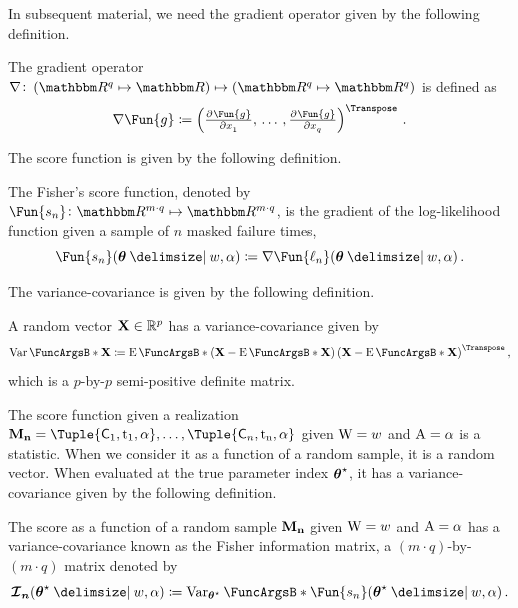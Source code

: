 \documentclass[
    11pt,
    extrafontsizes,
    article,
    oldfontcommands,
    final,
    oneside,
    openany,
    hidelinks]{memoir}
\begin{document}
In subsequent material, we need the gradient operator given by the following definition.
\begin{definition}
The gradient operator $\nabla \colon \left(\RealSet^q \mapsto \RealSet\right) \mapsto \left(\RealSet^q \mapsto \RealSet^q\right)$ is defined as
\begin{equation}
    \nabla \Fun{g} \coloneqq \left (
        \pd{\Fun{g}}{x_1},\,
        \ldots\,,
        \pd{\Fun{g}}{x_q}
    \right )^{\Transpose}\,.
\end{equation}
\end{definition}

The score function is given by the following definition.
\begin{definition}
The Fisher's score function, denoted by $\Fun{s_n} \colon \RealSet^{m \cdot q} \mapsto \RealSet^{m \cdot q}$, is the gradient of the log-likelihood function given a sample of $n$ masked failure times,
\begin{equation}
\label{eq:score}
    \Fun{s_n}(\sysparamvec \Given w, \alpha) \coloneqq \nabla \Fun{\ell_n}(\sysparamvec \Given w, \alpha)\,.
\end{equation}
\end{definition}

The variance-covariance is given by the following definition.
\begin{definition}
A random vector $\mathrm{\boldsymbol{\mathbf{X}}} \in \mathbb{R}^{p}$ has a variance-covariance given by
\begin{equation}
\label{eq:covariance_matrix_op}
    \Var{\RV{\vec{X}}} \coloneqq \Expect{
        \left(\RV{\vec{X}} - \Expect{\RV{\vec{X}}} \right)
        \left(\RV{\vec{X}} - \Expect{\RV{\vec{X}}} \right)^\Transpose
    }\,,
\end{equation}
which is a $p$-by-$p$ semi-positive definite matrix.
\end{definition}

The score function given a realization $\mfs = \Tuple{\cand_1,\ti_1,\alpha},\ldots,\Tuple{\cand_n,\ti_n,\alpha}$ given $\mathrm{W} = w$ and $\mathrm{A} = \alpha$ is a statistic.
When we consider it as a function of a random sample, it is a random vector.
When evaluated at the true parameter index ${\boldsymbol{\mathbf{\theta}}}^{\star}$, it has a variance-covariance given by the following definition.
\begin{definition}
\label{def:info_matrix_var}
The score as a function of a random sample $\boldsymbol{\mathbf{M_n}}$ given $\mathrm{W} = w$ and $\mathrm{A} = \alpha$ has a variance-covariance known as the Fisher information matrix, a $(m \cdot q)$-by-$(m \cdot q)$ matrix denoted by
\begin{equation}
\label{eq:info_matrix_var}
    \infomatrx_{\matrx{n}}(\tparam\sysparamvec \Given w, \alpha)
        \coloneqq \Var{\Fun{s_n}(\tparam\sysparamvec \Given w, \alpha)}[\tparam\sysparamvec]\,.
\end{equation}
\end{definition}
\end{document}
